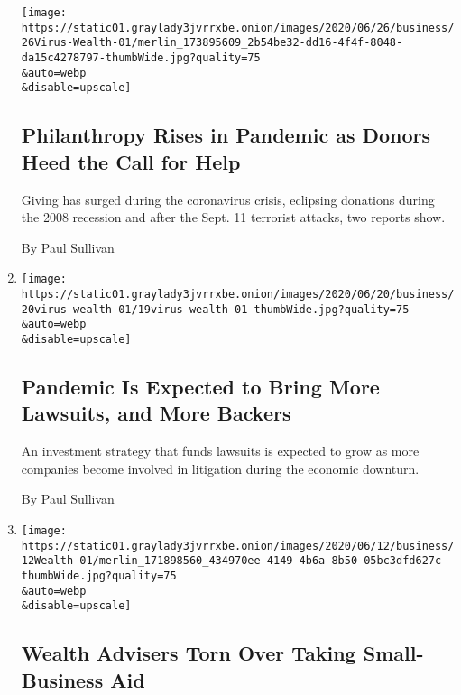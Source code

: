 \begin{enumerate}
  \texttt{[image: https://static01.graylady3jvrrxbe.onion/images/2020/06/26/business/26Virus-Wealth-01/merlin\_173895609\_2b54be32-dd16-4f4f-8048-da15c4278797-thumbWide.jpg?quality=75\\\&auto=webp\\\&disable=upscale]}

  \hypertarget{philanthropy-rises-in-pandemic-as-donors-heed-the-call-for-help}{%
  \subsection{Philanthropy Rises in Pandemic as Donors Heed the Call for
  Help}\label{philanthropy-rises-in-pandemic-as-donors-heed-the-call-for-help}}

  Giving has surged during the coronavirus crisis, eclipsing donations
  during the 2008 recession and after the Sept. 11 terrorist attacks,
  two reports show.

  By Paul Sullivan
\item
  \href{/2020/06/19/your-money/lawsuits-litigation-finance-coronavirus.html}{}

  \texttt{[image: https://static01.graylady3jvrrxbe.onion/images/2020/06/20/business/20virus-wealth-01/19virus-wealth-01-thumbWide.jpg?quality=75\\\&auto=webp\\\&disable=upscale]}

  \hypertarget{pandemic-is-expected-to-bring-more-lawsuits-and-more-backers}{%
  \subsection{Pandemic Is Expected to Bring More Lawsuits, and More
  Backers}\label{pandemic-is-expected-to-bring-more-lawsuits-and-more-backers}}

  An investment strategy that funds lawsuits is expected to grow as more
  companies become involved in litigation during the economic downturn.

  By Paul Sullivan
\item
  \href{/2020/06/12/your-money/wealth-advisers-torn-over-taking-small-business-aid.html}{}

  \texttt{[image: https://static01.graylady3jvrrxbe.onion/images/2020/06/12/business/12Wealth-01/merlin\_171898560\_434970ee-4149-4b6a-8b50-05bc3dfd627c-thumbWide.jpg?quality=75\\\&auto=webp\\\&disable=upscale]}

  \hypertarget{wealth-advisers-torn-over-taking-small-business-aid}{%
  \subsection{Wealth Advisers Torn Over Taking Small-Business
  Aid}\label{wealth-advisers-torn-over-taking-small-business-aid}}


\end{enumerate}
